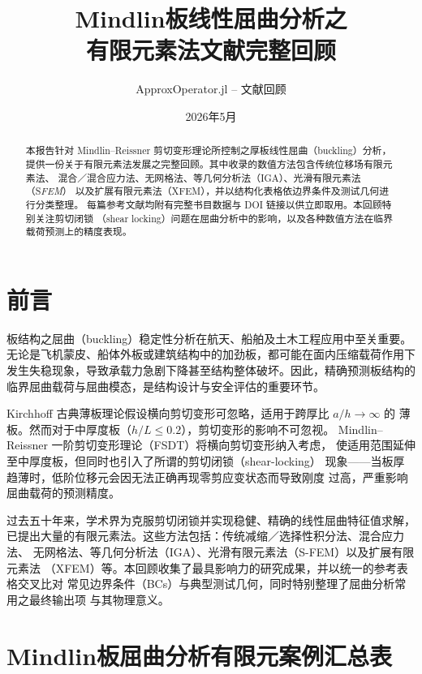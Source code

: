 \documentclass[12pt,a4paper]{article}
\title{\textbf{Mindlin板线性屈曲分析之\\有限元素法文献完整回顾}}
\author{ApproxOperator.jl -- 文献回顾}
\date{2026年5月}
\begin{document}
\maketitle

\begin{abstract}
本报告针对 Mindlin--Reissner 剪切变形理论所控制之厚板线性屈曲（buckling）分析，
提供一份关于有限元素法发展之完整回顾。其中收录的数值方法包含传统位移场有限元素法、
混合／混合应力法、无网格法、等几何分析法（IGA）、光滑有限元素法（S\textit{FEM}）
以及扩展有限元素法（XFEM），并以结构化表格依边界条件及测试几何进行分类整理。
每篇参考文献均附有完整书目数据与 DOI 链接以供立即取用。本回顾特别关注剪切闭锁
（shear locking）问题在屈曲分析中的影响，以及各种数值方法在临界载荷预测上的精度表现。
\end{abstract}

\section{前言}
板结构之屈曲（buckling）稳定性分析在航天、船舶及土木工程应用中至关重要。
无论是飞机蒙皮、船体外板或建筑结构中的加劲板，都可能在面内压缩载荷作用下
发生失稳现象，导致承载力急剧下降甚至结构整体破坏。因此，精确预测板结构的
临界屈曲载荷与屈曲模态，是结构设计与安全评估的重要环节。

Kirchhoff 古典薄板理论假设横向剪切变形可忽略，适用于跨厚比 $a/h \to \infty$ 的
薄板。然而对于中厚度板（$h/L \leq 0.2$），剪切变形的影响不可忽视。
Mindlin--Reissner 一阶剪切变形理论（FSDT）将横向剪切变形纳入考虑，
使适用范围延伸至中厚度板，但同时也引入了所谓的剪切闭锁（shear-locking）
现象——当板厚趋薄时，低阶位移元会因无法正确再现零剪应变状态而导致刚度
过高，严重影响屈曲载荷的预测精度。

过去五十年来，学术界为克服剪切闭锁并实现稳健、精确的线性屈曲特征值求解，
已提出大量的有限元素法。这些方法包括：传统减缩／选择性积分法、混合应力法、
无网格法、等几何分析法（IGA）、光滑有限元素法（S-FEM）以及扩展有限元素法
（XFEM）等。本回顾收集了最具影响力的研究成果，并以统一的参考表格交叉比对
常见边界条件（BCs）与典型测试几何，同时特别整理了屈曲分析常用之最终输出项
与其物理意义。


\section{Mindlin板屈曲分析有限元案例汇总表}
\label{sec:table}
\end{document}
